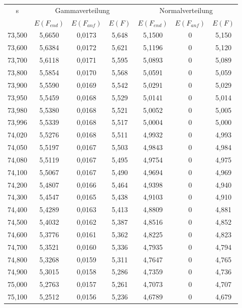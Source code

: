 \begin{table}
	\centering
\begin{tabular}{|c||c|c|c||c|c|c|}
\hline
\multirow{2}{*}{s} & \multicolumn{3}{c||}{Gammaverteilung} & \multicolumn{3}{c|}{Normalverteilung}\\
\cline{2-7}
 & \(E\left(F_{end}\right)\) & \(E\left(F_{anf}\right)\) & \(E\left(F\right)\) & \(E\left(F_{end}\right)\) & \(E\left(F_{anf}\right)\) & \(E\left(F\right)\)  \\
\hline
73,500 & 5,6650 & 0,0173 & 5,648 & 5,1500 & 0 & 5,150 \\
73,600 & 5,6384 & 0,0172 & 5,621 & 5,1196 & 0 & 5,120 \\
73,700 & 5,6118 & 0,0171 & 5,595 & 5,0893 & 0 & 5,089 \\
73,800 & 5,5854 & 0,0170 & 5,568 & 5,0591 & 0 & 5,059 \\
73,900 & 5,5590 & 0,0169 & 5,542 & 5,0291 & 0 & 5,029 \\
73,950 & 5,5459 & 0,0168 & 5,529 & 5,0141 & 0 & 5,014 \\
73,980 & 5,5380 & 0,0168 & 5,521 & 5,0052 & 0 & 5,005 \\
\hline
73,996 & 5,5339 & 0,0168 & 5,517 & 5,0004 & 0 & \cellcolor[gray]{0.8} 5,000 \\
\hline
74,020 & 5,5276 & 0,0168 & 5,511 & 4,9932 & 0 & 4,993 \\
74,050 & 5,5197 & 0,0167 & 5,503 & 4,9843 & 0 & 4,984 \\
74,080 & 5,5119 & 0,0167 & 5,495 & 4,9754 & 0 & 4,975 \\
74,100 & 5,5067 & 0,0167 & 5,490 & 4,9694 & 0 & 4,969 \\
74,200 & 5,4807 & 0,0166 & 5,464 & 4,9398 & 0 & 4,940 \\
74,300 & 5,4547 & 0,0165 & 5,438 & 4,9103 & 0 & 4,910 \\
74,400 & 5,4289 & 0,0163 & 5,413 & 4,8809 & 0 & 4,881 \\
74,500 & 5,4032 & 0,0162 & 5,387 & 4,8516 & 0 & 4,852 \\
74,600 & 5,3776 & 0,0161 & 5,362 & 4,8225 & 0 & 4,823 \\
74,700 & 5,3521 & 0,0160 & 5,336 & 4,7935 & 0 & 4,794 \\
74,800 & 5,3268 & 0,0159 & 5,311 & 4,7647 & 0 & 4,765 \\
74,900 & 5,3015 & 0,0158 & 5,286 & 4,7359 & 0 & 4,736 \\
75,000 & 5,2763 & 0,0157 & 5,261 & 4,7073 & 0 & 4,707 \\
75,100 & 5,2512 & 0,0156 & 5,236 & 4,6789 & 0 & 4,679 \\

\end{tabular}
\end{table}
